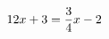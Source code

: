 \documentclass[preview]{standalone}
\begin{document}
\begin{align*}
\special{dvisvgm:raw <g id='unique000'>}12x + 3 = \frac{3}{4}x - 2\special{dvisvgm:raw </g>}
\end{align*}
\end{document}
